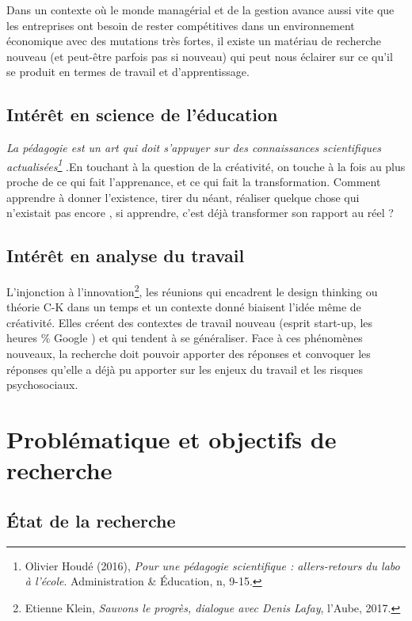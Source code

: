 \documentclass{article}
\begin{document}
Dans un contexte où le monde managérial et de la gestion avance aussi vite que les entreprises ont besoin de rester compétitives dans un environnement économique avec des mutations très fortes, il existe un matériau de recherche nouveau (et peut-être parfois pas si nouveau) qui peut nous éclairer sur ce qu'il se produit en termes de travail et d'apprentissage.

\subsection{Intérêt en science de l'éducation}

\og \textit{La pédagogie est un art qui doit s'appuyer sur des connaissances scientifiques actualisées\footnote{Olivier Houdé (2016), \emph{Pour une pédagogie scientifique : allers-retours du labo à l'école}. Administration \& Éducation, n, 9-15.} }.\fg En touchant à la question de la créativité, on touche à la fois au plus proche de ce qui fait l'apprenance, et ce qui fait la transformation. Comment apprendre à \og donner l'existence, tirer du néant, réaliser quelque chose qui n'existait pas encore \fg{}, si apprendre, c'est déjà transformer son rapport au réel ?

\subsection{Intérêt en analyse du travail}

L'injonction à l'innovation\footnote{Etienne Klein, \emph{Sauvons le progrès, dialogue avec Denis Lafay}, l’Aube, 2017.}, les réunions qui encadrent le \og design thinking \fg{} ou \og théorie C-K \fg{} dans un temps et un contexte donné biaisent l'idée même de créativité.
Elles créent des contextes de travail nouveau (esprit start-up, les heures \% Google \fg{}) et qui tendent à se généraliser. 
Face à ces phénomènes nouveaux, la recherche doit pouvoir apporter des réponses et convoquer les réponses qu'elle a déjà pu apporter sur les enjeux du travail et les risques psychosociaux.

\section{Problématique et objectifs de recherche}

\subsection{État de la recherche}
\end{document}
